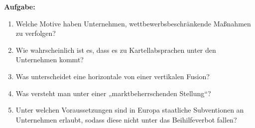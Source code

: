 
\textbf{Aufgabe:}

\begin{enumerate}[label=(\alph*)]
    \item Welche Motive haben Unternehmen, wettbewerbsbeschränkende Maßnahmen zu verfolgen?
    \item Wie wahrscheinlich ist es, dass es zu Kartellabsprachen unter den Unternehmen kommt?
    \item Was unterscheidet eine horizontale von einer vertikalen Fusion?
    \item Was versteht man unter einer „marktbeherrschenden Stellung“?
    \item Unter welchen Voraussetzungen sind in Europa staatliche Subventionen an Unternehmen erlaubt, sodass diese nicht unter das Beihilfeverbot fallen?
\end{enumerate}

